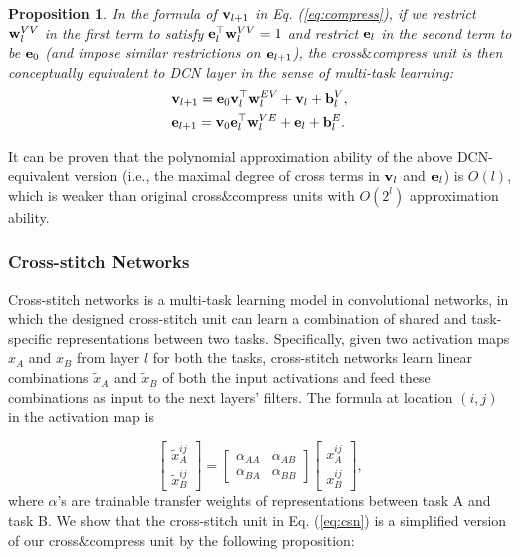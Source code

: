 \documentclass[sigconf]{acmart}
\newtheorem{proposition}{Proposition}
\begin{document}
		\begin{proposition}
		\label{prop:2}
			In the formula of ${\bf v}_{l+1}$ in Eq. (\ref{eq:compress}), if we restrict ${\bf w}_l^{VV}$ in the first term to satisfy ${\bf e}_l^\top {\bf w}_l^{VV} = 1$ and restrict ${\bf e}_l$ in the second term to be ${\bf e}_0$ (and impose similar restrictions on ${\bf e}_{l+1}$), the cross$\&$compress unit is then conceptually equivalent to DCN layer in the sense of multi-task learning:
			\begin{equation}
			\label{eq:dcn}
			\begin{split}
				&{\bf v}_{l+1} = {\bf e}_0 {\bf v}_l^\top {\bf w}_l^{EV} + {\bf v}_l + {\bf b}_l^V,\\
				&{\bf e}_{l+1} = {\bf v}_0 {\bf e}_l^\top {\bf w}_l^{VE} + {\bf e}_l + {\bf b}_l^E.
			\end{split}
			\end{equation}
		\end{proposition}
		
		It can be proven that the polynomial approximation ability of the above DCN-equivalent version (i.e., the maximal degree of cross terms in ${\bf v}_l$ and ${\bf e}_l$) is $O(l)$, which is weaker than original cross$\&$compress units with $O(2^l)$ approximation ability.
		
		\subsubsection{Cross-stitch Networks}
		Cross-stitch networks \cite{misra2016cross} is a multi-task learning model in convolutional networks, in which the designed cross-stitch unit can learn a combination of shared and task-specific representations between two tasks.
		Specifically, given two activation maps $x_A$ and $x_B$ from layer $l$ for both the tasks, cross-stitch networks learn linear combinations $\tilde x_A$ and $\tilde x_B$ of both the input activations and feed these combinations as input to the next layers' filters.
		The formula at location $(i, j)$ in the activation map is
		
		\begin{equation}
		\label{eq:csn}
			\begin{bmatrix}
   				\tilde x_A^{ij}\\[5pt]
   				\tilde x_B^{ij}
  			\end{bmatrix}
  			=
  			\begin{bmatrix}
   				\alpha_{AA} & \alpha_{AB}\\
   				\alpha_{BA} & \alpha_{BB}
  			\end{bmatrix}
  			\begin{bmatrix}
   				x_A^{ij}\\[5pt]
   				x_B^{ij}
  			\end{bmatrix},
		\end{equation}
		where $\alpha$'s are trainable transfer weights of representations between task A and task B.
		We show that the cross-stitch unit in Eq. (\ref{eq:csn}) is a simplified version of our cross$\&$compress unit by the following proposition:
		
\end{document}
